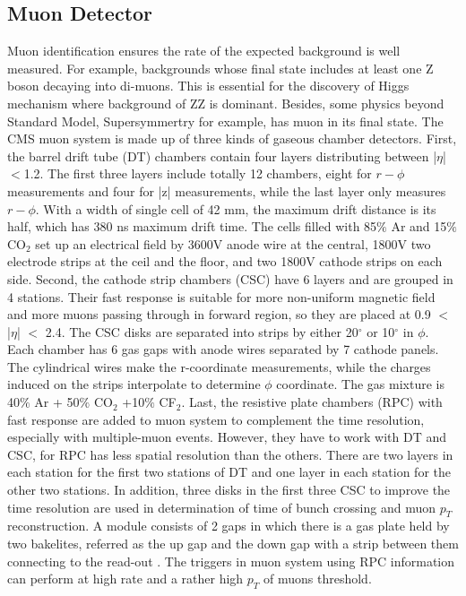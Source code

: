 \subsection{Muon Detector} 
Muon identification ensures the rate of the expected background is well measured. 
For example, backgrounds whose final state includes at least one Z boson decaying into di-muons. 
This is essential for the discovery of Higgs mechanism where background of ZZ is dominant.
Besides, some physics beyond Standard Model, Supersymmertry for example, has muon in its final state.
The CMS muon system is made up of three kinds of gaseous chamber detectors. 
First, the barrel drift tube (DT) chambers contain four layers distributing between |$\eta $| $<$1.2.
The first three layers include totally 12 chambers, eight for $r-\phi$ measurements and four for |z| measurements, while the last layer only measures $r-\phi$. 
With a width of single cell of 42 mm, the maximum drift distance is its half, which has 380 ns maximum drift time. 
The cells filled with 85$\% $ Ar and 15$\% $ CO$_2$ set up an electrical field by 3600V anode wire at the central, 1800V two electrode strips at the ceil and the floor, and two  1800V cathode strips on each side. 
Second, the cathode strip chambers (CSC) have 6 layers and are grouped in 4 stations.
Their fast response is suitable for more non-uniform magnetic field and more muons passing through in forward region, so they are placed at 0.9 $<$ |$\eta $| $<$ 2.4.
The CSC disks are separated into strips by either 20$^{\circ} $ or 10$^{\circ} $ in $\phi $. 
Each chamber has 6 gas gaps with anode wires separated by 7 cathode panels. 
The cylindrical wires make the r-coordinate measurements, while the charges induced on the strips interpolate to determine $\phi $ coordinate.
The gas mixture is 40$\% $ Ar + 50$\% $ CO$_2$ +10$\% $ CF$_2$. 
Last, the resistive plate chambers (RPC) with fast response are added to muon system to complement the time resolution, especially with multiple-muon events.
However, they have to work with DT and CSC, for RPC has less spatial resolution than the others.
There are two layers in each station for the first two stations of DT and one layer in each station for the other two stations. 
In addition, three disks in the first three CSC to improve the time resolution are used in determination of time of bunch crossing and muon $p_T$ reconstruction.
A module consists of 2 gaps in which there is a gas plate held by two bakelites, referred as the up gap and the down gap with a strip between them connecting to the read-out .
The triggers in muon system using RPC information can perform at high rate and a rather high $p_{T}$ of muons threshold.

